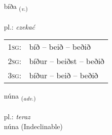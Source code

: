 \documentclass[frontgrid, backgrid]{flacards}\usepackage[]{graphicx}\usepackage[]{xcolor}
\begin{document}
\renewcommand{\flhead}{\vskip5pt \fboxsep=0pt {\small\bfseries\footnotesize Sagnorð | Verb}}
\renewcommand{\fcfoot}{\vskip5pt \fboxsep=0pt \hspace{2pt}{\small\bfseries\footnotesize 1K}}

\renewcommand{\blhead}{\vskip5pt {\small\bfseries\footnotesize Sagnorð | Verb }}
\renewcommand{\bcfoot}{\vskip5pt \hspace{2pt}{\small\bfseries\footnotesize 1K}}


{bíða \small{\textsubscript{(\textit{v.})}} \\[1ex] %
\textphonetic{[piːða]} \\
pl.: \emph{czekać} \\  [2ex]
\renewcommand*{\arraystretch}{0.8}
\begin{tabular}{p{1cm}l}
\textsc{1sg}: & bíð -- beið -- beðið \\ 
\textsc{2sg}: & bíður -- beiðst -- beðið \\ 
\textsc{3sg}: & bíður -- beið -- beðið \\ 
\end{tabular}
}


\renewcommand{\flhead}{\vskip5pt \fboxsep=0pt {\small\bfseries\footnotesize Atviksorð | Adverb}}
\renewcommand{\fcfoot}{\vskip5pt \fboxsep=0pt \hspace{2pt}{\small\bfseries\footnotesize 1K}}

\renewcommand{\blhead}{\vskip5pt {\small\bfseries\footnotesize Atviksorð | Adverb }}
\renewcommand{\bcfoot}{\vskip5pt \hspace{2pt}{\small\bfseries\footnotesize 1K}}


{núna \small{\textsubscript{(\textit{adv.})}} \\[1ex]
\textphonetic{[nuːna]} \\
pl.: \emph{teraz} \\  [2ex]
núna (Indeclinable)}

\renewcommand{\flhead}{\vskip5pt \fboxsep=0pt {\small\bfseries\footnotesize Sagnorð | Verb}}
\renewcommand{\fcfoot}{\vskip5pt \fboxsep=0pt \hspace{2pt}{\small\bfseries\footnotesize 1K}}
\end{document}
